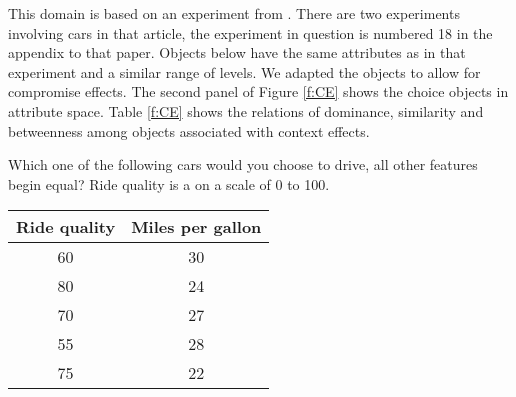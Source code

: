 This domain is based on an experiment from .
There are two experiments involving cars in that article, the experiment in question is  numbered 18 in the appendix to that paper.
Objects below have the same attributes as in that experiment and a similar range of levels.
We adapted the objects to allow for compromise effects.
The second panel of Figure \ref{f:CE} shows the choice objects in attribute space.
Table \ref{f:CE} shows the relations of dominance, similarity and betweenness among objects associated with context effects.

\begin{tcolorbox}
Which one of the following cars would you choose to drive, all other features
begin equal? Ride quality is a on a scale of 0 to 100.

\begin{tabular}{cc}
\hline
Ride quality & Miles per gallon \\ \hline
60 & 30 \\ 
80 & 24 \\ 
70 & 27 \\ 
55 & 28 \\ 
75 & 22 \\ \hline
\end{tabular}
\end{tcolorbox}
